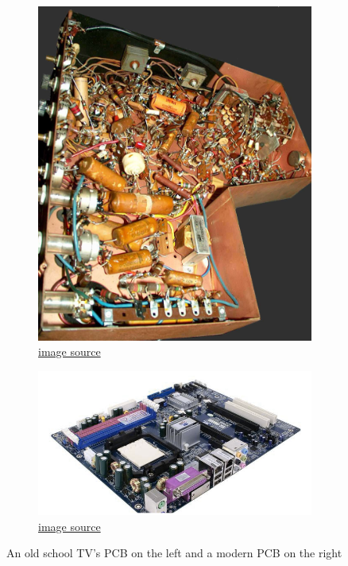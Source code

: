 \documentclass[final]{cubedoc}
\begin{document}
	\begin{figure}[h!]
		\centering
		\begin{subfigure}{.5\textwidth}
			\centering
			\includegraphics[height=0.25\textheight, width=.8\textwidth]{assets/old_school_TV_PCB.jpg}
			\caption{\href{https://web.archive.org/web/20200813142459/https://www.edn.com/the-pcb-is-the-most-important-component-of-your-design/}{image source}}
			\label{fig:sub1}
		\end{subfigure}%
		\begin{subfigure}{.5\textwidth}
			\centering
			\includegraphics[height=0.25\textheight, width=.8\textwidth]{assets/modern_pcb.png}
			\caption{\href{https://web.archive.org/web/20200813143650/https://www.pcbsky.com/computers.html}{image source}}
			\label{fig:sub2}
		\end{subfigure}
		\caption{An old school TV's PCB on the left and a modern PCB on the right}
		\label{fig:test}
	\end{figure}
	
\end{document}
